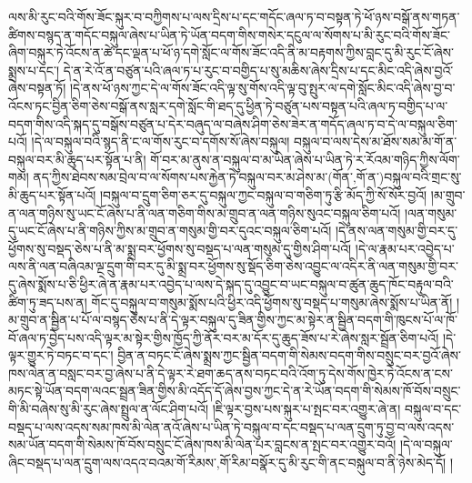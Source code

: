 ལས་མི་རུང་བའི་གོས་ཟོང་སྐུར་བ་བཀྱིགས་པ་ལས་དྲིས་པ་དང་གདོང་ཞལ་ཏ་བ་བསྟན་ཏེ་ཕོ་ཉས་བསྒོ་ནས་གཏན་ཚིགས་བསྙད་ན་གདོང་བསྐུལ་ཞེས་པ་ཡིན་ཏེ་ཡོན་བདག་གིས་གསེར་དངུལ་ལ་སོགས་པ་མི་རུང་བའི་གོས་ཟོང་ཞིག་བསྐུར་ཏེ་འོངས་ན་ཚེ་དང་ལྡན་པ་ཕོ་ཉ་དགེ་སློང་ལ་གོས་ཟོང་འདི་ནི་མ་བརྟགས་ཀྱིས་བླང་དུ་མི་རུང་ངོ་ཞེས་སྨྲས་པ་དང་། དེ་ན་རེ་འོ་ན་བཙུན་པའི་ཞལ་ཏ་པ་རུང་བ་བགྱིད་པ་སུ་མཆིས་ཞེས་དྲིས་པ་དང་མིང་འདི་ཞེས་བྱའོ་ཞེས་བསྟན་ཏོ། །དེ་ནས་ཕོ་ཉས་ཀྱང་དེ་ལ་གོས་ཟོང་འདི་ལྟ་སུ་གོས་འདི་ལྟ་བུ་སྤུར་ལ་དགེ་སློང་མིང་འདི་ཞེས་བྱ་བ་འོངས་ཏང་བྱིན་ཅིག་ཅེས་བསྒོ་ནས་སླར་དགེ་སློང་གི་ཐད་དུ་ཕྱིན་ཏེ་བཙུན་པས་བསྟན་པའི་ཞལ་ཏ་བགྱིད་པ་ལ་བདག་གིས་འདི་སྐད་དུ་བསྒོས་བཙུན་པ་དེར་བཞུད་ལ་བཞེས་ཤིག་ཅེས་ཟེར་ན་གདོད་ཞལ་ཏ་བ་དེ་ལ་བསྐུལ་ཅིག་པའོ། །དེ་ལ་བསྐུལ་བའི་སྙད་ནི་ང་ལ་གོས་རུང་བ་དགོས་སོ་ཞེས་བསྐུལ། བསྐུལ་བ་ལས་དེས་མ་ཐོས་སམ་མ་གོ་ན་བསྐུལ་བར་མི་ཆུད་པར་སྟོན་པ་ནི། གོ་བར་མ་ནུས་ན་བསྐུལ་བ་མ་ཡིན་ཞེས་པ་ཡིན་ཏེ་ར་རོའམ་གཉིད་ཀྱིས་ལོག་གམ། ནད་ཀྱིས་ཐེབས་སམ་བྲེལ་བ་ལ་སོགས་པས་རྐྱེན་ཏེ་བསྐུལ་བར་མ་ཤེས་མ་(གོན་‚གོ་ན་)བསྐུལ་བའི་གྲང་སུ་མི་ཆུད་པར་སྟོན་པའོ། །བསྐུལ་བ་དྲུག་ཅིག་ཅར་དུ་བསྐུལ་ཀྱང་བསྐུལ་བ་གཅིག་ཏུ་རྩི་མོད་ཀྱི་སོ་སོར་བྱའོ། །མ་གྲུབ་ན་ལན་གཉིས་སུ་ཡང་ངོ་ཞེས་པ་ནི་ལན་གཅིག་གིས་མ་གྲུབ་ན་ལན་གཉིས་སུའང་བསྐུལ་ཅིག་པའོ། །ལན་གསུམ་དུ་ཡང་ངོ་ཞེས་པ་ནི་གཉིས་ཀྱིས་མ་གྲུབ་ན་གསུམ་གྱི་བར་དུའང་བསྐུལ་ཅིག་པའོ། །དེ་ནས་ལན་གསུམ་གྱི་བར་དུ་ཕྱོགས་སུ་བསྡད་ཅེས་པ་ནི་མ་སྨྲ་བར་ཕྱོགས་སུ་བསྡད་པ་ལན་གསུམ་དུ་གྱིས་ཤིག་པའོ། །དེ་ལ་རྣམ་པར་འབྱེད་པ་ལས་ནི་ལན་བཞིའམ་ལྔ་དྲུག་གི་བར་དུ་མི་སྨྲ་བར་ཕྱོགས་སུ་སྡོད་ཅིག་ཅེས་འབྱུང་ལ་འདིར་ནི་ལན་གསུམ་གྱི་བར་དུ་ཞེས་སྨོས་པ་ཅི་ཕྱིར་ཞེ་ན་རྣམ་པར་འབྱེད་པ་ལས་དེ་སྐད་དུ་འབྱུང་བ་ཡང་བསྐུལ་བ་ཚུན་ཆུད་ཁོང་བརྟུལ་བའི་ཚིག་ཏུ་ཟད་པས་ན། གོང་དུ་བསྐུལ་བ་གསུམ་སྨོས་པའི་ཕྱིར་འདི་ཕྱོགས་སུ་བསྡད་པ་གསུམ་ཞེས་སྨོས་པ་ཡིན་ནོ། །མ་གྲུབ་ན་སྦྱིན་པ་པོ་ལ་བསྙད་ཅེས་པ་ནི་དེ་ལྟར་བསྐུལ་དུ་ཟིན་གྱིས་ཀྱང་མ་སྟེར་ན་སྦྱིན་བདག་གི་ཁུངས་པོ་ལ་ཁོ་བོ་ཞལ་ཏ་བྱེད་པས་འདི་ལྟར་མ་སྟེར་གྱིས་ཁྱོད་ཀྱི་ནོར་བར་མ་དོར་དུ་ཆུད་ཟོས་པ་རེ་ཞེས་སླར་སྦྲོན་ཅིག་པའོ། །དེ་ལྟར་གྱུར་ཏེ་བཏང་བ་དང་། བྱིན་ན་བཏང་ངོ་ཞེས་སྨྲས་ཀྱང་སྦྱིན་བདག་གི་སེམས་བདག་གིས་བསྲུང་བར་བྱའོ་ཞེས་ཁས་ལེན་ན་བསླང་བར་བྱ་ཞེས་པ་ནི་དེ་ལྟར་རེ་ཐག་ཆད་ནས་བཏང་བའི་འོག་ཏུ་དེས་གོས་ཁྱེར་ཏེ་འོངས་ན་ངས་མཏང་སྟེ་ཡོན་བདག་ལའང་སྦྲན་ཟིན་གྱིས་མི་འདོད་དོ་ཞེས་བྱས་ཀྱང་དེ་ན་རེ་ཡོན་བདག་གི་སེམས་ཁོ་བོས་བསྲུང་གི་མི་བཞེས་སུ་མི་རུང་ཞེས་སྤྲུལ་ན་ལོང་ཤིག་པའོ། །ཇི་ལྟར་བྱས་པས་སྐུར་པ་སྤང་བར་འགྱུར་ཞེ་ན། བསྐུལ་བ་དང་བསྡད་པ་ལས་འདས་སམ་ཁས་མི་ལེན་ནའོ་ཞེས་པ་ཡིན་ཏེ་བསྐུལ་བ་དང་བསྡད་པ་ལན་དྲུག་ཏུ་བྱ་བ་ལས་འདས་སམ་ཡོན་བདག་གི་སེམས་ཁོ་བོས་བསྲུང་ངོ་ཞེས་ཁས་མི་ལེན་པར་བླངས་ན་སྤང་བར་འགྱུར་བའོ། །དེ་ལ་བསྐུལ་ཞིང་བསྡད་པ་ལན་དྲུག་ལས་འདའ་བའམ་{གོ་རིམས་,གོ་རིམ་}བསྣོར་དུ་མི་རུང་གི་ནང་བསྐུལ་བ་ནི་ཉེས་མེད་དོ། །
